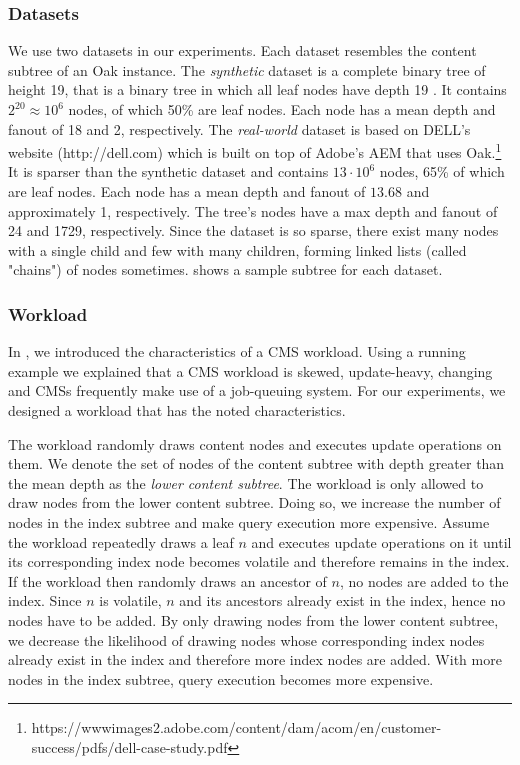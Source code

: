 \documentclass[abstracton,12pt]{scrartcl}
\theoremstyle{definition}
\begin{document}
\vspace{-0.4cm}

\subsubsection{Datasets}

\label{sec:datasets}

We use two datasets in our experiments. Each dataset resembles the content
subtree of an Oak instance. The \textit{synthetic} dataset is a complete binary
tree of height 19, that is a binary tree in which all leaf nodes have depth 19
\cite{Cormen}. It contains $2^{20} \approx 10^6$ nodes, of which 50\% are leaf
nodes. Each node has a mean depth and fanout of 18 and 2, respectively. The
\textit{real-world} dataset is based on DELL's website (http://dell.com)
which is built on top of Adobe's AEM that uses Oak.\footnote{https://wwwimages2.adobe.com/content/dam/acom/en/customer-success/pdfs/dell-case-study.pdf}
It is sparser than the synthetic dataset and contains $13 \cdot 10^6$
nodes, 65\% of which are leaf nodes. Each node has a mean depth and fanout of
$13.68$ and approximately 1, respectively. The tree's nodes have a max depth and fanout of 24
and 1729, respectively. Since the dataset is so sparse, there exist many nodes with 
a single child and few with many children, forming linked lists (called "chains")
of nodes sometimes.  shows a sample subtree for each dataset.

\vspace{-0.2cm}

\subsubsection{Workload}

\label{sec:workload}

In , we introduced the characteristics of a CMS
workload. Using a running example we explained that a CMS workload is skewed,
update-heavy, changing and CMSs frequently make use of a job-queuing system.
For our experiments, we designed a workload that has the noted characteristics.

The workload randomly draws content nodes and executes update operations on them.
We denote the set of nodes of the content subtree with
depth greater than the mean depth as the \textit{lower content subtree}.
The workload is only allowed to draw nodes from the lower content subtree.
Doing so, we increase the number of nodes in the index subtree and make
query execution more expensive.
Assume the workload repeatedly draws a leaf $n$ and
executes update operations on it until its corresponding index node
becomes volatile and therefore remains in the index. If the workload
then randomly draws an ancestor of $n$, no nodes are added to the index.
Since $n$ is volatile, $n$ and its ancestors already exist in the index,
hence no nodes have to be added. By only drawing nodes from the lower
content subtree, we decrease the likelihood of drawing nodes whose
corresponding index nodes already exist in the index and therefore
more index nodes are added. With more nodes in the index subtree,
query execution becomes more expensive.
\end{document}
